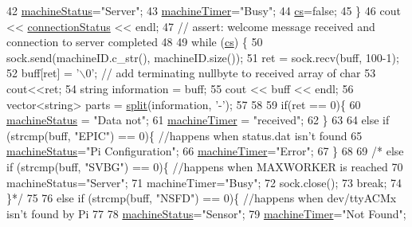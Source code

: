 \begin{DoxyCode}
42         \hyperlink{classCLIENT_a83578b8ade6203c7a78972b3393e923b}{machineStatus}=\textcolor{stringliteral}{"Server"};
43         \hyperlink{classCLIENT_a0474dbf26b3f3a99bf7579278453ef79}{machineTimer}=\textcolor{stringliteral}{"Busy"};
44         \hyperlink{classCLIENT_af7973e9a611e41850653f69b9e9e3e8f}{cs}=\textcolor{keyword}{false};
45       \}
46   cout << \hyperlink{classCLIENT_a750c6b410d6358c35e415031dfd350c8}{connectionStatus} << endl;
47   \textcolor{comment}{// assert:  welcome message received and connection to server completed}
48 
49   \textcolor{keywordflow}{while} (\hyperlink{classCLIENT_af7973e9a611e41850653f69b9e9e3e8f}{cs}) \{
50     sock.send(machineID.c\_str(), machineID.size());
51     ret = sock.recv(buff, 100-1);
52     buff[ret] = \textcolor{charliteral}{'\(\backslash\)0'};  \textcolor{comment}{// add terminating nullbyte to received array of char}
53     cout<<ret;
54     \textcolor{keywordtype}{string} information = buff;
55     cout << buff << endl;
56     vector<string> parts = \hyperlink{classCLIENT_a007cf416382fd529a3456f9c5db5771f}{split}(information, \textcolor{charliteral}{'-'});
57 
58 
59     \textcolor{keywordflow}{if}(ret == 0)\{
60         \hyperlink{classCLIENT_a83578b8ade6203c7a78972b3393e923b}{machineStatus} = \textcolor{stringliteral}{"Data not"};
61         \hyperlink{classCLIENT_a0474dbf26b3f3a99bf7579278453ef79}{machineTimer} = \textcolor{stringliteral}{"received"};
62     \}
63 
64     \textcolor{keywordflow}{else} \textcolor{keywordflow}{if} (strcmp(buff, \textcolor{stringliteral}{"EPIC"}) == 0)\{   \textcolor{comment}{//happens when status.dat isn't found}
65       \hyperlink{classCLIENT_a83578b8ade6203c7a78972b3393e923b}{machineStatus}=\textcolor{stringliteral}{"Pi Configuration"};
66       \hyperlink{classCLIENT_a0474dbf26b3f3a99bf7579278453ef79}{machineTimer}=\textcolor{stringliteral}{"Error"};
67     \}
68 
69  \textcolor{comment}{/*   else if (strcmp(buff, "SVBG") == 0)\{      //happens when MAXWORKER is reached}
70 \textcolor{comment}{      machineStatus="Server";}
71 \textcolor{comment}{      machineTimer="Busy";}
72 \textcolor{comment}{      sock.close();}
73 \textcolor{comment}{      break;}
74 \textcolor{comment}{    \}*/}
75 
76     \textcolor{keywordflow}{else} \textcolor{keywordflow}{if} (strcmp(buff, \textcolor{stringliteral}{"NSFD"}) == 0)\{      \textcolor{comment}{//happens when dev/ttyACMx isn't found by Pi}
77 
78       \hyperlink{classCLIENT_a83578b8ade6203c7a78972b3393e923b}{machineStatus}=\textcolor{stringliteral}{"Sensor"};
79       \hyperlink{classCLIENT_a0474dbf26b3f3a99bf7579278453ef79}{machineTimer}=\textcolor{stringliteral}{"Not Found"};

\end{DoxyCode}
